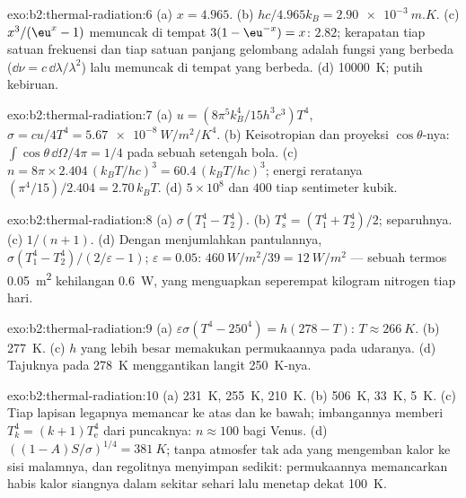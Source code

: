 \begin{solution}{exo:b2:thermal-radiation:6}
(a) $x = 4.965$. (b) $hc/4.965k_B = \qty{2.90e-3}{m.K}$. (c) $x^3/(\eu^x - 1)$
memuncak di tempat $3(1 - \eu^{-x}) = x$: $2.82$; kerapatan tiap satuan frekuensi
dan tiap satuan panjang gelombang adalah fungsi yang berbeda ($\dd\nu = c\,\dd\lambda/\lambda^2$)
lalu memuncak di tempat yang berbeda. (d) \qty{10000}{K}; putih kebiruan.
\end{solution}

\begin{solution}{exo:b2:thermal-radiation:7}
(a) $u = (8\pi^5k_B^4/15h^3c^3)T^4$, $\sigma = cu/4T^4 = \qty{5.67e-8}{W/m^2/K^4}$.
(b) Keisotropian dan proyeksi $\cos\theta$-nya: $\int\cos\theta\,\dd\Omega/4\pi = 1/4$
pada sebuah setengah bola. (c) $n = 8\pi \times 2.404\,(k_BT/hc)^3 = 60.4\,(k_BT/hc)^3$;
energi reratanya $(\pi^4/15)/2.404 = 2.70\,k_BT$. (d) $5 \times 10^8$ dan $400$
tiap sentimeter kubik.
\end{solution}

\begin{solution}{exo:b2:thermal-radiation:8}
(a) $\sigma(T_1^4 - T_2^4)$. (b) $T_{\text{s}}^4 = (T_1^4 + T_2^4)/2$; separuhnya. (c)
$1/(n + 1)$. (d) Dengan menjumlahkan pantulannya, $\sigma(T_1^4 - T_2^4)/(2/\varepsilon -
1)$; $\varepsilon = 0.05$: $\qty{460}{W/m^2}/39 = \qty{12}{W/m^2}$ --- sebuah termos
\qty{0.05}{m^2} kehilangan \qty{0.6}{W}, yang menguapkan seperempat kilogram
nitrogen tiap hari.
\end{solution}

\begin{solution}{exo:b2:thermal-radiation:9}
(a) $\varepsilon\sigma(T^4 - 250^4) = h(278 - T)$: $T \approx \qty{266}{K}$. (b)
\qty{277}{K}. (c) $h$ yang lebih besar memakukan permukaannya pada udaranya. (d) Tajuknya
pada \qty{278}{K} menggantikan langit \qty{250}{K}-nya.
\end{solution}

\begin{solution}{exo:b2:thermal-radiation:10}
(a) \qty{231}{K}, \qty{255}{K}, \qty{210}{K}. (b) \qty{506}{K}, \qty{33}{K}, \qty{5}{K}.
(c) Tiap lapisan legapnya memancar ke atas dan ke bawah; imbangannya memberi
$T_k^4 = (k + 1)T_{\text{e}}^4$ dari puncaknya: $n \approx 100$ bagi Venus. (d)
$((1 - A)S/\sigma)^{1/4} = \qty{381}{K}$; tanpa atmosfer tak ada yang mengemban
kalor ke sisi malamnya, dan regolitnya menyimpan sedikit: permukaannya
memancarkan habis kalor siangnya dalam sekitar sehari lalu menetap dekat
\qty{100}{K}.
\end{solution}

